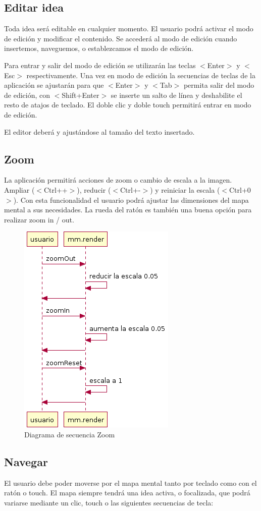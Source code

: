 \subsection{Editar idea}
Toda idea será editable en cualquier momento. El usuario podrá activar el modo de edición y modificar el contenido. Se accederá al modo de edición cuando insertemos, naveguemos, o establezcamos el modo de edición. 

Para entrar y salir del modo de edición se utilizarán las teclas $<$Enter$>$ y $<$Esc$>$ respectivamente. Una vez en modo de edición la secuencias de teclas de la aplicación se ajustarán para que $<$Enter$>$ y $<$Tab$>$ permita salir del modo de edición, con $<$Shift+Enter$>$ se inserte un salto de línea y deshabilite el resto de atajos de teclado. El doble clic y doble touch permitirá entrar en modo de edición.

El editor deberá y ajustándose al tamaño del texto insertado.   

\subsection{Zoom}
La aplicación permitirá acciones de zoom o cambio de escala a la imagen. Ampliar ($<$Ctrl++$>$), reducir ($<$Ctrl+-$>$) y reiniciar la escala ($<$Ctrl+0$>$). Con esta funcionalidad el usuario podrá ajustar las dimensiones del mapa mental a sus necesidades. La rueda del ratón es también una buena opción para realizar zoom in / out.

\begin{figure}[tbph]
\centering
\includegraphics[width=0.4\linewidth]{imagenes/diagrama-seq-zoom}
\caption{Diagrama de secuencia Zoom}
\label{fig:diagrama-seq-zoom}
\end{figure}


\subsection{Navegar}
El usuario debe poder moverse por el mapa mental tanto por teclado como con el ratón o touch. El mapa siempre tendrá una idea activa, o focalizada, que podrá variarse mediante un clic, touch o las siguientes secuencias de tecla:

